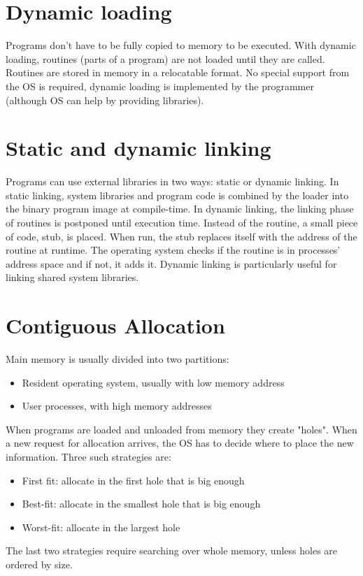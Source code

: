 
\section{Dynamic loading}
Programs don't have to be fully copied to memory to be executed. With dynamic loading, routines (parts of a program) are not loaded until they are called. Routines are stored in memory in a relocatable format. No special support from the OS is required, dynamic loading is implemented by the programmer (although OS can help by providing libraries).

\section{Static and dynamic linking}
Programs can use external libraries in two ways: static or dynamic linking. In static linking, system libraries and program code is combined by the loader into the binary program image at compile-time. In dynamic linking, the linking phase of routines is postponed until execution time. Instead of the routine, a small piece of code, stub, is placed. When run, the stub replaces itself with the address of the routine at runtime. The operating system checks if the routine is in processes' address space and if not, it adds it. Dynamic linking is particularly useful for linking shared system libraries.

\section{Contiguous Allocation}
Main memory is usually divided into two partitions:
\begin{itemize}
    \item Resident operating system, usually with low memory address
    \item User processes, with high memory addresses
\end{itemize}
When programs are loaded and unloaded from memory they create "holes". When a new request for allocation arrives, the OS has to decide where to place the new information. Three such strategies are:
\begin{itemize}
    \item First fit: allocate in the first hole that is big enough
    \item Best-fit: allocate in the smallest hole that is big enough
    \item Worst-fit: allocate in the largest hole
\end{itemize}
The last two strategies require searching over whole memory, unless holes are ordered by size.

